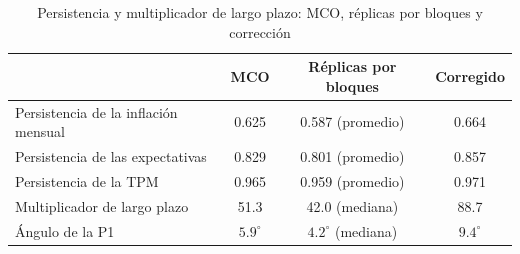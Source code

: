 \begin{table}[H]
\centering
\caption{Persistencia y multiplicador de largo plazo: MCO, réplicas por bloques y corrección}
\label{tab:D_persistencia}
\small
\begin{tabular}{@{}lccc@{}}
\toprule
 & MCO & Réplicas por bloques & Corregido \\
\midrule
Persistencia de la inflación mensual & 0.625 & 0.587 (promedio) & 0.664 \\
Persistencia de las expectativas & 0.829 & 0.801 (promedio) & 0.857 \\
Persistencia de la TPM & 0.965 & 0.959 (promedio) & 0.971 \\
Multiplicador de largo plazo & 51.3 & 42.0 (mediana) & 88.7 \\
Ángulo de la P1 & $5.9^\circ$ & $4.2^\circ$ (mediana) & $9.4^\circ$ \\
\bottomrule
\end{tabular}
\end{table}
